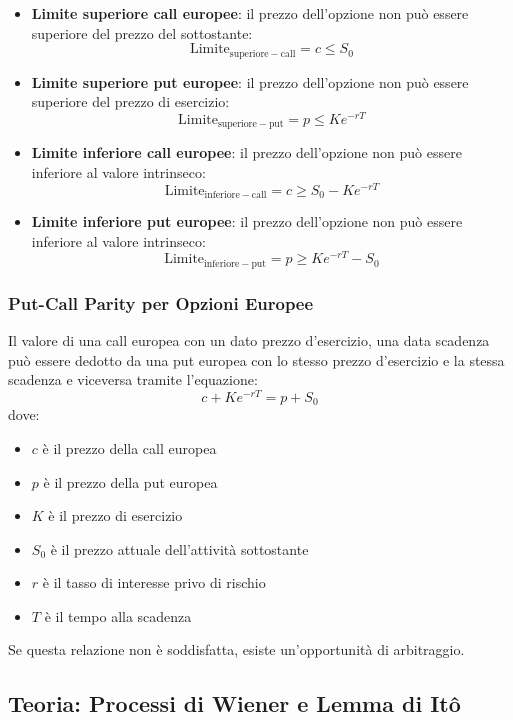 \documentclass[12pt,a4paper]{report}
\begin{document}
\begin{itemize}
    \item \textbf{Limite superiore call europee}: il prezzo dell'opzione non può essere superiore del prezzo del sottostante:
    \[
    \mathrm{Limite}_{\mathrm{superiore-call}} = c \leq S_0
    \]

\item \textbf{Limite superiore put europee}: il prezzo dell'opzione non può essere superiore del prezzo di esercizio:
    \[
    \mathrm{Limite}_{\mathrm{superiore-put}} = p \leq Ke^{-rT}
    \]
\item \textbf{Limite inferiore call europee}: il prezzo dell'opzione non può essere inferiore al valore intrinseco:
    \[
    \mathrm{Limite}_{\mathrm{inferiore-call}} = c \geq S_0 - Ke^{-rT}
    \]

\item \textbf{Limite inferiore put europee}: il prezzo dell'opzione non può essere inferiore al valore intrinseco:
    \[
    \mathrm{Limite}_{\mathrm{inferiore-put}} = p \geq Ke^{-rT} - S_0
    \]
\end{itemize}
\subsubsection{Put-Call Parity per Opzioni Europee}
Il valore di una call europea con un dato prezzo d'esercizio, una data scadenza può essere dedotto da una put europea con lo stesso prezzo d'esercizio e la stessa scadenza e viceversa tramite l'equazione:
\[
c + K e^{-rT} = p + S_0
\]
dove:
\begin{itemize}
    \item \(c\) è il prezzo della call europea
    \item \(p\) è il prezzo della put europea
    \item \(K\) è il prezzo di esercizio
    \item \(S_0\) è il prezzo attuale dell'attività sottostante
    \item \(r\) è il tasso di interesse privo di rischio
    \item \(T\) è il tempo alla scadenza
\end{itemize}
Se questa relazione non è soddisfatta, esiste un'opportunità di arbitraggio.
\newpage
\subsection{Teoria: Processi di Wiener e Lemma di Itô}
\end{document}
